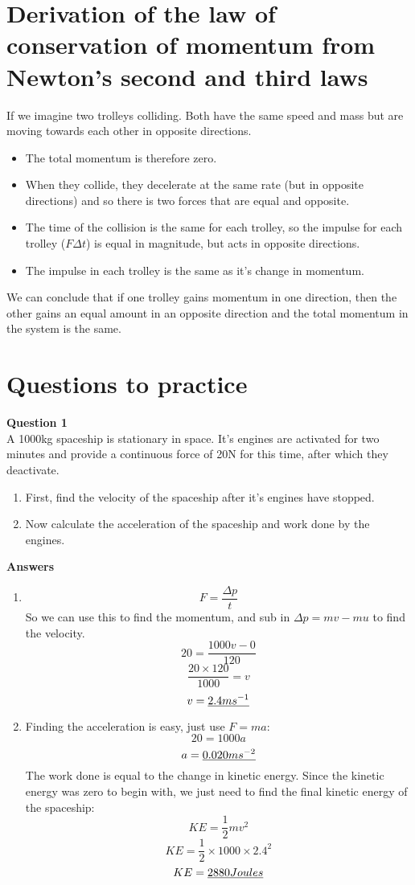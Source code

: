 \documentclass{article}
\begin{document}
\section*{Derivation of the law of conservation of momentum from Newton's second
and third laws}
If we imagine two trolleys colliding. Both have the same speed and mass but are
moving towards each other in opposite directions. 
\begin{itemize}
	\item The total momentum is therefore zero.
	\item When they collide, they decelerate at the same rate (but in opposite
	directions) and so there is two forces that are equal and opposite.
	\item The time of the collision is the same for each trolley, so the impulse
	for each trolley ($F \Delta t$) is equal in magnitude, but acts in opposite
	directions.
	\item The impulse in each trolley is the same as it's change in momentum.
\end{itemize}

We can conclude that if one trolley gains momentum in one direction, then the
other gains an equal amount in an opposite direction and the total momentum in
the system is the same.

\section*{Questions to practice}
\textbf{Question 1}\\
A 1000kg spaceship is stationary in space. It's engines are activated for two
minutes and provide a continuous force of 20N for this time, after which they
deactivate.

\begin{enumerate}
	\item First, find the velocity of the spaceship after it's engines have
	stopped.
	\item Now calculate the acceleration of the spaceship and work done by the
	engines.
	
\end{enumerate}

\noindent
\textbf{Answers}
\begin{enumerate}
	\item \[
		F = \frac{\Delta p}{t}
		\]
		So we can use this to find the momentum, and sub in $\Delta p = mv - mu$
		to find the velocity.
		\[
			20 = \frac{1000v - 0}{120}
		\]
		\[
			\frac{20 \times 120}{1000} = v
		\]
		\[
			v = \uline{2.4ms^{-1}}
		\]
	\item Finding the acceleration is easy, just use $F = ma$:
	\[
		20 = 1000a
	\]
	\[
		a = \uline{0.020ms^{-2}}
	\]
	The work done is equal to the change in kinetic energy. Since the kinetic
	energy was zero to begin with, we just need to find the final kinetic energy
	of the spaceship:
	\[
		KE = \frac{1}{2}mv^2
	\]
	\[
		KE = \frac{1}{2} \times 1000 \times 2.4^2
	\]
	\[
		KE = \uline{2880 Joules}
	\]
\end{enumerate}
\end{document}
